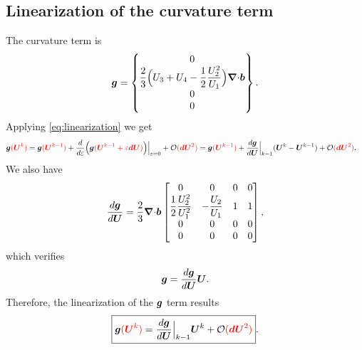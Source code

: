\documentclass[a4paper,10pt]{article}
\newcommand{\bm}[1]{\text{\boldmath$#1$\unboldmath}}
\newcommand{\Div}{{\bm{\nabla}\cdot}}
\renewcommand{\b}{\bm{b}}
\newcommand{\DiscFunc}[1]{\bm{#1}}
\renewcommand{\u}{\DiscFunc{U}}
\newcommand{\fo}[1]{{ \color{red} ( #1 )\color{black} }} %
\begin{document}
\subsection{Linearization of the curvature term \bm{g}}
The curvature term is
\begin{equation*}
  \bm{g} =  \begin{Bmatrix}
                     0 \\                    
                     \dfrac{2}{3}\Big(U_3+U_4 -\dfrac{1}{2}\dfrac{U_2^2}{U_1}\Big)\Div \b \\
                     0 \\
                     0
            \end{Bmatrix}.
\end{equation*}
Applying \eqref{eq:linearization} we get
\begin{equation*}
\begin{split}
 \bm{g}\fo{\u^k} &= \bm{g}\fo{\u^{k-1}}+\frac{d}{d\varepsilon}\Big(\bm{g}\fo{\u^{k-1}+\varepsilon\bm{dU}}\Big)\Big|_{\varepsilon=0}+\mathcal{O}\fo{\bm{dU}^2}
              = \bm{g}\fo{\u^{k-1}}+\frac{d\bm{g}}{d\u}\Big|_{k-1}(\u^k-\u^{k-1})+\mathcal{O}\fo{\bm{dU}^2}.
\end{split}
\end{equation*}
We also have
\begin{equation*}
 \frac{d\bm{g}}{d\u} = \frac{2}{3}\Div\b\begin{bmatrix}
                        0 & 0 & 0 & 0 \\
                        \dfrac{1}{2} \dfrac{U_2^2}{U_1^2} & -\dfrac{U_2}{U_1} & 1 & 1\\
                         0 & 0 & 0 & 0 \\
                         0 & 0 & 0 & 0 
                       \end{bmatrix},
\end{equation*}
which verifies
\[
 \bm{g} = \frac{d\bm{g}}{d\u} \u.
\]
Therefore, the linearization of the $\bm{g}$ term results
\begin{equation*}
\boxed{
 \bm{g}\fo{\u^k} = \frac{d\bm{g}}{d\u}\Big|_{k-1}\u^k+\mathcal{O}\fo{\bm{dU}^2}
 }.
\end{equation*}
\end{document}
